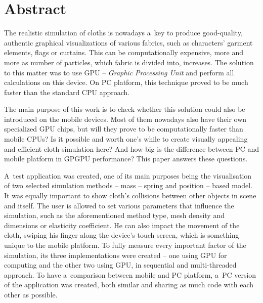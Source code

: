 \chapter*{Abstract}


The realistic simulation of cloths is nowadays a~key to produce good-quality, authentic graphical visualizations of various fabrics, such as characters' garment elements, flags or curtains. This can be computationally expensive, more and more as number of particles, which fabric is divided into, increases. The solution to this matter was to use GPU -- \emph{Graphic Processing Unit} and perform all calculations on this device. On PC platform, this technique proved to be much faster than the standard CPU approach.

The main purpose of this work is to check whether this solution could also be introduced on the mobile devices. Most of them nowadays also have their own specialized GPU chips, but will they prove to be computationally faster than mobile CPUs? Is it possible and worth one's while to create visually appealing and efficient cloth simulation here? And how big is the difference between PC and mobile platform in GPGPU performance? This paper answers these questions.

A~test application was created, one of its main purposes being the visualisation of two selected simulation methods -- mass -- spring and position -- based model. It was equally important to show cloth's collisions between other objects in scene and itself. The user is allowed to set various parameters that influence the simulation, such as the aforementioned method type, mesh density and dimensions or elasticity coefficient. He can also impact the movement of the cloth, swiping his finger along the device's touch screen, which is something unique to the mobile platform. To fully measure every important factor of the simulation, its three implementations were created -- one using GPU for computing and the other two using GPU, in sequential and multi-threaded approach. To have a~comparison between mobile and PC platform, a~PC version of the application was created, both similar and sharing as much code with each other as possible.

